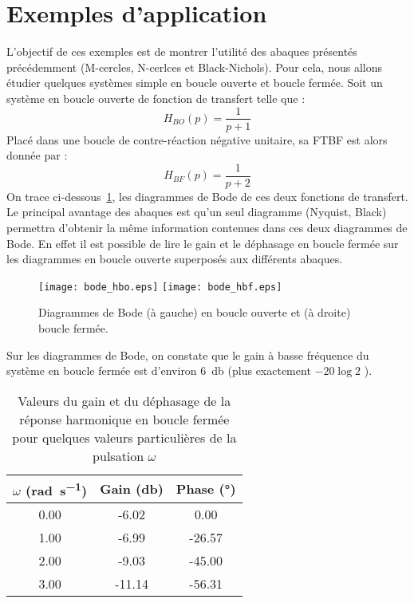 \section{Exemples d'application}\label{exemples-dapplication}
L'objectif de ces exemples est de montrer l'utilité des abaques présentés 
précédemment (M-cercles, N-cerlces et Black-Nichols). Pour cela, nous allons 
étudier quelques systèmes simple en boucle ouverte et boucle fermée.
Soit un système en boucle ouverte de fonction de transfert telle que :
\[
    H_{BO}(p)=\dfrac{1}{p+1}
\]
Placé dans une boucle de contre-réaction négative unitaire, sa FTBF est alors
donnée par :
\[
    H_{BF}(p)=\dfrac{1}{p+2}
\]
On trace ci-dessous~\cref{fig-exemple1_bodeBlackNichols}, les diagrammes de 
Bode de ces deux fonctions de transfert. Le principal avantage des abaques est 
qu'un seul diagramme (Nyquist, Black) 
permettra d'obtenir la même information contenues dans ces deux 
diagrammes de Bode.
En effet il est possible de lire le gain et le déphasage en boucle fermée
sur les diagrammes en boucle ouverte superposés aux différents abaques.
\begin{figure}[!h]
    \centering
    \texttt{[image: bode\_hbo.eps]}
    \texttt{[image: bode\_hbf.eps]}
    \caption{Diagrammes de Bode (à gauche) en boucle ouverte et (à droite) 
    boucle fermée.\label{fig-exemple1_bodeBlackNichols}}
\end{figure}
Sur les diagrammes de Bode, on constate que le gain à basse fréquence du 
système en boucle fermée est d'environ \SI{6}{\decibel} 
(plus exactement $-20\log{2}$ ). 
\begin{table}
    \centering
    \begin{tabular}{ccc}
    \hline
        $\omega$ (\si{\radian\per\second}) & 
                      Gain (\si{\decibel}) & Phase (\si{\degree})\\
    \hline
    0.00 & -6.02 & 0.00\\
    1.00 & -6.99 & -26.57\\
    2.00 & -9.03 & -45.00\\
    3.00 & -11.14 & -56.31\\
    \hline
    \end{tabular}
    \caption{Valeurs du gain et du déphasage de la réponse harmonique
            en boucle fermée pour quelques valeurs particulières de la pulsation
            $\omega$}
\end{table}

